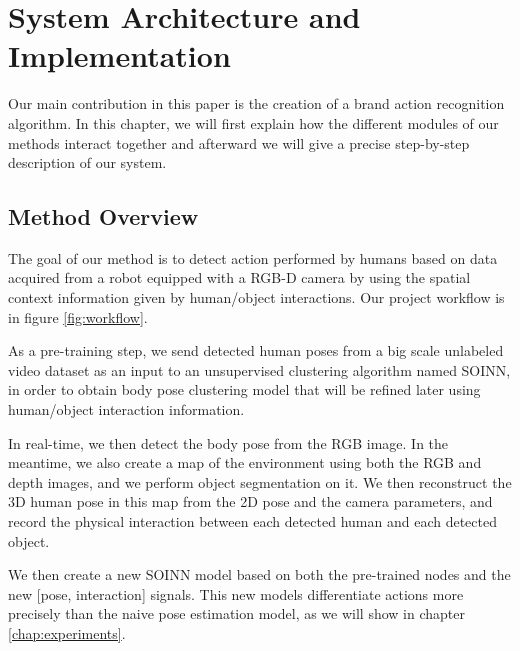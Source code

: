 \chapter{System Architecture and Implementation}
\label{chap:archi}

Our main contribution in this paper is the creation of a brand action recognition algorithm. In this chapter, we will first explain how the different modules of our methods interact together and afterward we will give a precise step-by-step description of our system.

\section{Method Overview}
The goal of our method is to detect action performed by humans based on data acquired from a robot equipped with a RGB-D camera by using the spatial context information given by human/object interactions. Our project workflow is in figure \ref{fig:workflow}.

As a pre-training step, we send detected human poses from a big scale unlabeled video dataset as an input to an unsupervised clustering algorithm named SOINN, in order to obtain body pose clustering model that will be refined later using human/object interaction information.

In real-time, we then detect the body pose from the RGB image. In the meantime, we also create a map of the environment using both the RGB and depth images, and we perform object segmentation on it. We then reconstruct the 3D human pose in this map from the 2D pose and the camera parameters, and record the physical interaction between each detected human and each detected object.

We then create a new SOINN model based on both the pre-trained nodes and the new [pose, interaction] signals. This new models differentiate actions more precisely than the naive pose estimation model, as we will show in chapter \ref{chap:experiments}.

